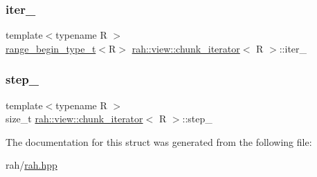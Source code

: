 \mbox{\label{structrah_1_1view_1_1chunk__iterator_aef5f9e293b2ab1757b52977197568fbf}} 
\subsubsection{\texorpdfstring{iter\_}{iter\_}}
{\footnotesize\ttfamily template$<$typename R $>$ \\
\mbox{\hyperlink{namespacerah_a28aff4eeddcece6be65ff0b956d32d4a}{range\+\_\+begin\+\_\+type\+\_\+t}}$<$R$>$ \mbox{\hyperlink{structrah_1_1view_1_1chunk__iterator}{rah\+::view\+::chunk\+\_\+iterator}}$<$ R $>$\+::iter\+\_\+}

\mbox{\label{structrah_1_1view_1_1chunk__iterator_a71025fe393b81b113b2773063c4126be}} 
\subsubsection{\texorpdfstring{step\_}{step\_}}
{\footnotesize\ttfamily template$<$typename R $>$ \\
size\+\_\+t \mbox{\hyperlink{structrah_1_1view_1_1chunk__iterator}{rah\+::view\+::chunk\+\_\+iterator}}$<$ R $>$\+::step\+\_\+}



The documentation for this struct was generated from the following file\+:\begin{DoxyCompactItemize}
\item 
rah/\mbox{\hyperlink{rah_8hpp}{rah.\+hpp}}\end{DoxyCompactItemize}
